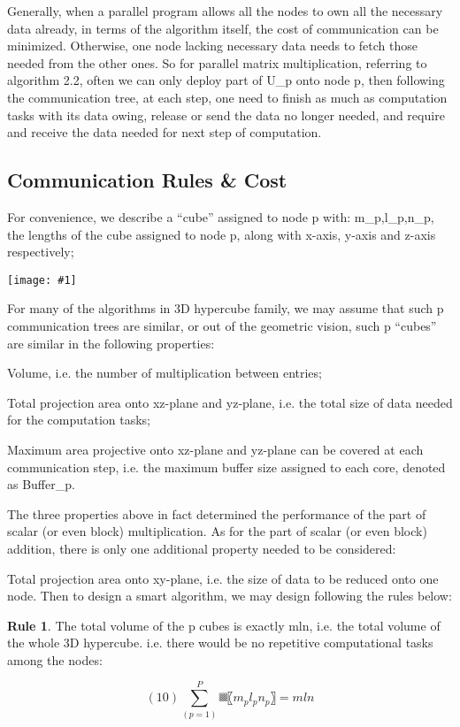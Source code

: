 \documentclass{amsart}
\theoremstyle{definition}
\newtheorem{Rule}[theorem]{Rule}
\theoremstyle{remark}
\numberwithin{equation}{section}
\newcommand{\addpic}[1]{\texttt{[image: \#1]}}
\begin{document}
		Generally, when a parallel program allows all the nodes to own all the necessary data already, in terms of the algorithm itself, the cost of communication can be minimized. Otherwise, one node lacking necessary data needs to fetch those needed from the other ones. So for parallel matrix multiplication, referring to algorithm 2.2, often we can only deploy part of U_p onto node p, then following the communication tree, at each step, one need to finish as much as computation tasks with its data owing, release or send the data no longer needed, and require and receive the data needed for next step of computation.
		
		\subsection{Communication Rules & Cost}
			For convenience, we describe a “cube” assigned to node p with:
				m_p,l_p,n_p, the lengths of the cube assigned to node p, along with x-axis, y-axis and z-axis respectively;
				
			\addpic{figures/cube}
			
			For many of the algorithms in 3D hypercube family, we may assume that such p communication trees are similar, or out of the geometric vision, such p “cubes” are similar in the following properties:
			
			Volume, i.e. the number of multiplication between entries;
			
			Total projection area onto xz-plane and yz-plane, i.e. the total size of data needed for the computation tasks;
			
			Maximum area projective onto xz-plane and yz-plane can be covered at each communication step, i.e. the maximum buffer size assigned to each core, denoted as Buffer_p.
			
			The three properties above in fact determined the performance of the part of scalar (or even block) multiplication. As for the part of scalar (or even block) addition, there is only one additional property needed to be considered:
			
				Total projection area onto xy-plane, i.e. the size of data to be reduced onto one node.
			Then to design a smart algorithm, we may design following the rules below:
			
			\begin{Rule}
			The total volume of the p cubes is exactly mln, i.e. the total volume of the whole 3D hypercube. i.e. there would be no repetitive computational tasks among the nodes:
			
			\[
			(10)	∑_(p=1)^P▒〖m_p l_p n_p 〗=mln
			\]
			\end{Rule}
			
\end{document}
